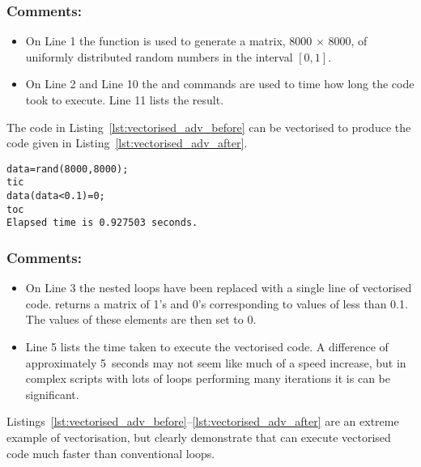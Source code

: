\subsubsection{Comments:}
\begin{itemize}
\item On Line 1 the  function is used to generate a matrix, 8000 $\times$ 8000, of uniformly distributed random numbers in the interval $[0,1]$.
\item On Line 2 and Line 10 the  and  commands are used to time how long the code took to execute. Line 11 lists the result.
\end{itemize}

The code in Listing~\ref{lst:vectorised_adv_before} can be vectorised to produce the code given in Listing~\ref{lst:vectorised_adv_after}.
\begin{lstlisting}[caption={Vectorisation of nested loops},label=lst:vectorised_adv_after]
data=rand(8000,8000);
tic
data(data<0.1)=0;
toc
Elapsed time is 0.927503 seconds.
\end{lstlisting}

\subsubsection{Comments:}
\begin{itemize}
\item On Line 3 the nested  loops have been replaced with a single line of vectorised code.  returns a matrix of 1's and 0's corresponding to values of  less than 0.1. The values of these elements are then set to 0.
\item Line 5 lists the time taken to execute the vectorised code. A difference of approximately 5~seconds may not seem like much of a speed increase, but in complex \mlab scripts with lots of loops performing many iterations it is can be significant.
\end{itemize}
Listings~\ref{lst:vectorised_adv_before}--\ref{lst:vectorised_adv_after} are an extreme example of vectorisation, but clearly demonstrate that \mlab can execute vectorised code much faster than conventional loops.
